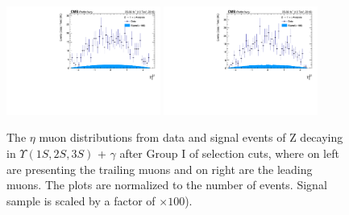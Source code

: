 \begin{figure}[!htbp]
\begin{center}
\includegraphics[width=0.45\textwidth]{figures_and_tables/outputPlots/ZtoUpsilon_Cat0_ZZZZZ/nEvts/data_x_mc/withKinCuts/h_withKin_TrailingMu_eta}\hspace*{1.cm}
\includegraphics[width=0.45\textwidth]{figures_and_tables/outputPlots/ZtoUpsilon_Cat0_ZZZZZ/nEvts/data_x_mc/withKinCuts/h_withKin_LeadingMu_eta}
\end{center}\vspace*{-.5cm}
\caption{The $\eta$ muon distributions from data and signal events of Z decaying in $\Upsilon(1S,2S,3S)$ + $\gamma$ after Group I of selection cuts, where on left are presenting the trailing muons and on right are the leading muons. The plots are normalized to the number of events. Signal sample is scaled by a factor of $\times 100$).}
\label{fig:etaMuons_ZtoUpsilon_Cat0_groupI_plus_II}
\end{figure}

